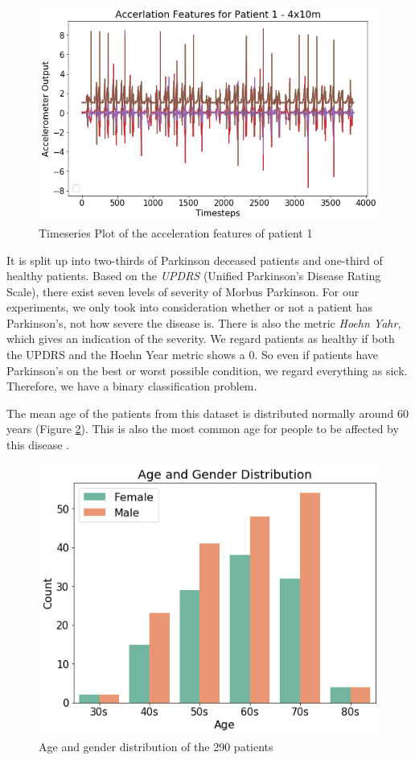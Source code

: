 \documentclass[journal]{IEEEtran}
\begin{document}
\begin{figure}
\centering
\includegraphics[width=1\linewidth]{../imgs/features}
\caption{Timeseries Plot of the acceleration features of patient 1}
\label{fig:features}
\end{figure}

It is split up into two-thirds of Parkinson deceased patients and one-third of healthy patients. Based on the \textit{UPDRS} (Unified Parkinson’s Disease Rating Scale), there exist seven levels of severity of Morbus Parkinson. For our experiments, we only took into consideration whether or not a patient has Parkinson's, not how severe the disease is. There is also the metric \textit{Hoehn Yahr}, which gives an indication of the severity. We regard patients as healthy if both the UPDRS and the Hoehn Year metric shows a 0. So even if patients have Parkinson's on the best or worst possible condition, we regard everything as sick. Therefore, we have a binary classification problem.

The mean age of the patients from this dataset is distributed normally around 60 years (Figure \ref{fig:age}). This is also the most common age for people to be affected by this disease \cite{cite3}. 

\begin{figure}
\centering
\includegraphics[width=1\linewidth]{../imgs/age}
\caption{Age and gender distribution of the 290 patients}
\label{fig:age}
\end{figure}
\end{document}
